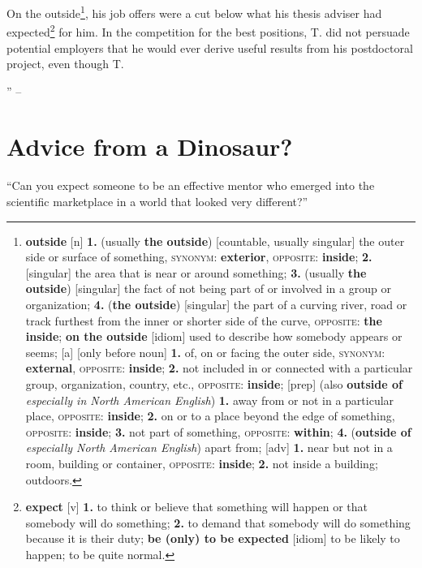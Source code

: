 \documentclass[oneside]{book}
\numberwithin{equation}{section}
\begin{document}
On the outside\footnote{\textbf{outside} [n] \textbf{1.} (usually \textbf{the outside}) [countable, usually singular] the outer side or surface of something, \textsc{synonym}: \textbf{exterior}, \textsc{opposite}: \textbf{inside}; \textbf{2.} [singular] the area that is near or around something; \textbf{3.} (usually \textbf{the outside}) [singular] the fact of not being part of or involved in a group or organization; \textbf{4.} (\textbf{the outside}) [singular] the part of a curving river, road or track furthest from the inner or shorter side of the curve, \textsc{opposite}: \textbf{the inside}; \textbf{on the outside} [idiom] used to describe how somebody appears or seems; [a] [only before noun] \textbf{1.} of, on or facing the outer side, \textsc{synonym}: \textbf{external}, \textsc{opposite}: \textbf{inside}; \textbf{2.} not included in or connected with a particular group, organization, country, etc., \textsc{opposite}: \textbf{inside}; [prep] (also \textbf{outside of} \textit{especially in North American English}) \textbf{1.} away from or not in a particular place, \textsc{opposite}: \textbf{inside}; \textbf{2.} on or to a place beyond the edge of something, \textsc{opposite}: \textbf{inside}; \textbf{3.} not part of something, \textsc{opposite}: \textbf{within}; \textbf{4.} (\textbf{outside of} \textit{especially North American English}) apart from; [adv] \textbf{1.} near but not in a room, building or container, \textsc{opposite}: \textbf{inside}; \textbf{2.} not inside a building; outdoors.}, his job offers were a cut below what his thesis adviser had expected\footnote{\textbf{expect} [v] \textbf{1.} to think or believe that something will happen or that somebody will do something; \textbf{2.} to demand that somebody will do something because it is their duty; \textbf{be (only) to be expected} [idiom] to be likely to happen; to be quite normal.} for him. In the competition for the best positions, T. did not persuade potential employers that he would ever derive useful results from his postdoctoral project, even though T. 

'' -- \cite[pp. 6--]{Feibelman2011}

\section{Advice from a Dinosaur?}

\begin{flushright}
	``Can you expect someone to be an effective mentor who emerged into the scientific marketplace in a world that looked very different?''
\end{flushright}
\end{document}
